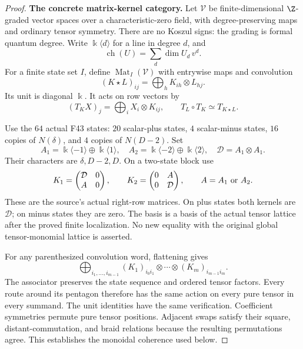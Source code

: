 \documentclass[11pt,a4paper]{article}
\newcommand{\A}{\mathbb A}\newcommand{\PP}{\mathbb P}\newcommand{\GL}{\mathrm{GL}}
\newcommand{\fid}[1]{\textsf{#1}}\newcommand{\gate}[1]{\textsf{#1}}
\theoremstyle{named}\newtheorem{finding}{Finding}[section]
\theoremstyle{definition}\newtheorem{definition}[finding]{Definition}
\theoremstyle{remark}\newtheorem{remark}[finding]{Remark}
\begin{document}
\begin{proof}
\par\smallskip\noindent\textbf{The concrete matrix-kernel category.}\quad
Let $\mathcal V$ be finite-dimensional $\Z$-graded vector
spaces over a characteristic-zero field, with
degree-preserving maps and ordinary tensor symmetry.
There are no Koszul signs: the grading is formal
quantum degree.
Write $\Bbbk\langle d\rangle$ for a line in degree $d$,
and
\[
 \operatorname{ch}(U)=\sum_d\dim U_d\,v^d.
\]
For a finite state set $I$, define
$\operatorname{Mat}_I(\mathcal V)$ with entrywise maps and
convolution
\begin{equation}\label{eq:gradedmatrixconvolution}
 (K\star L)_{ij}=\bigoplus_h K_{ih}\otimes L_{hj}.
\end{equation}
Its unit is diagonal $\Bbbk$.
It acts on row vectors by
\[
 (T_K X)_j=\bigoplus_i X_i\otimes K_{ij},
 \qquad T_L\circ T_K\simeq T_{K\star L}.
\]

Use the $64$ actual \fid{F43} states: $20$ scalar-plus
states, $4$ scalar-minus states, $16$ copies of $N(\delta)$,
and $4$ copies of $N(D-2)$.
Set
\[
 A_1=\Bbbk\langle-1\rangle\oplus\Bbbk\langle1\rangle,\quad
 A_2=\Bbbk\langle-2\rangle\oplus\Bbbk\langle2\rangle,\quad
 \mathcal D=A_1\otimes A_1.
\]
Their characters are $\delta,D-2,D$.
On a two-state block use
\begin{equation}\label{eq:actualgradedkernels}
 K_1=\begin{pmatrix}\mathcal D&0\\A&0\end{pmatrix},
 \qquad
 K_2=\begin{pmatrix}0&A\\0&\mathcal D\end{pmatrix},
 \qquad A=A_1\ \hbox{or}\ A_2.
\end{equation}
These are the source's actual right-row matrices.
On plus states both kernels are $\mathcal D$; on minus
states they are zero.
The basis is a basis of the actual tensor lattice after
the proved finite localization.
No new equality with the original global tensor-monomial
lattice is asserted.

For any parenthesized convolution word, flattening gives
\[
 \bigoplus_{i_1,\ldots,i_{m-1}}
 (K_1)_{i_0i_1}\otimes\cdots\otimes(K_m)_{i_{m-1}i_m}.
\]
The associator preserves the state sequence and ordered
tensor factors.
Every route around its pentagon therefore has the same
action on every pure tensor in every summand.
The unit identities have the same verification.
Coefficient symmetries permute pure tensor positions.
Adjacent swaps satisfy their square, distant-commutation,
and braid relations because the resulting permutations agree.
This establishes the monoidal coherence used below.


\end{proof}
\end{document}

